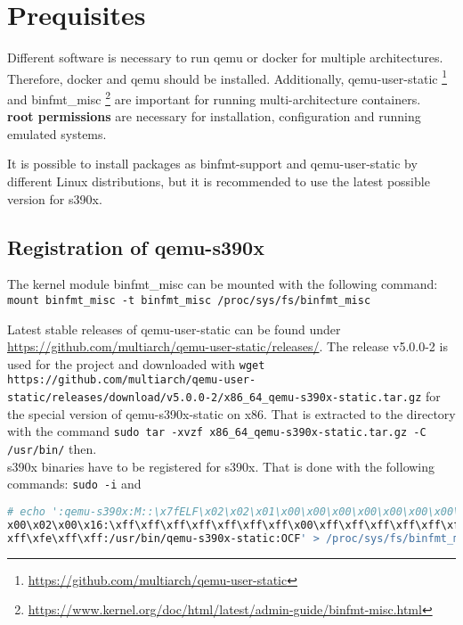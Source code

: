 \chapter{Prequisites}\label{ch:prequisites}


Different software is necessary to run qemu or docker for multiple architectures. Therefore, docker and qemu should be installed. Additionally, qemu-user-static \footnote{\url{https://github.com/multiarch/qemu-user-static}} and binfmt\_misc \footnote{\url{https://www.kernel.org/doc/html/latest/admin-guide/binfmt-misc.html}} are important for running multi-architecture containers. \\
\textbf{root permissions} are necessary for installation, configuration and running emulated systems.

It is possible to install packages as binfmt-support and qemu-user-static by different Linux distributions, but it is recommended to use the latest possible version for s390x. \\

\section{Registration of qemu-s390x}

The kernel module binfmt\_misc can be mounted with the following command: \\
\lstinline!mount binfmt_misc -t binfmt_misc /proc/sys/fs/binfmt_misc!

Latest stable releases of qemu-user-static can be found under \url{https://github.com/multiarch/qemu-user-static/releases/}. The release v5.0.0-2 is used for the project and downloaded with \lstinline!wget https://github.com/multiarch/qemu-user-static/releases/download/v5.0.0-2/x86_64_qemu-s390x-static.tar.gz! for the special version of qemu-s390x-static on x86. That is extracted to the directory  with the command \lstinline!sudo tar -xvzf x86_64_qemu-s390x-static.tar.gz -C /usr/bin/! then. \\

s390x binaries have to be registered for s390x. That is done with the following commands: \lstinline!sudo -i! and \begin{lstlisting}[language=bash, numberstyle=\myHexNumber, caption={Register s390x binaries},captionpos=b]
# echo ':qemu-s390x:M::\x7fELF\x02\x02\x01\x00\x00\x00\x00\x00\x00\x00\x00\x00\ 
x00\x02\x00\x16:\xff\xff\xff\xff\xff\xff\xff\x00\xff\xff\xff\xff\xff\xff\xff\xff\
xff\xfe\xff\xff:/usr/bin/qemu-s390x-static:OCF' > /proc/sys/fs/binfmt_misc/register
\end{lstlisting}

